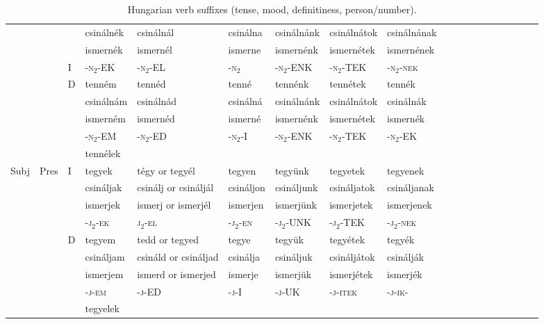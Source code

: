\documentclass[11pt,letterpaper]{article}
\begin{document}
\begin{table}[]
{\begin{tabular}{lll||llllllllllllllll}
      &     &        & csinálnék &	csinálnál &	csinálna &	csinálnánk 	&csinálnátok &	csinálnának \\
  &&&    ismernék &	ismernél &	ismerne &	ismernénk &	ismernétek &	ismernének \\
  & &   I    &-\textsc{n}$_2$-EK &	-\textsc{n}$_2$-EL &	-\textsc{n}$_2$ &	-\textsc{n}$_2$-ENK &	-\textsc{n}$_2$-TEK &	-\textsc{n}$_2$-\textsc{nek} \\\hline
   &&  D    &tenném &	tennéd &	tenné &	tennénk &	tennétek &	tennék \\
   &&       & csinálnám &	csinálnád &	csinálná &	csinálnánk &	csinálnátok &	csinálnák \\
 &&&  ismerném &	ismernéd &	ismerné &	ismernénk 	&ismernétek &	ismernék \\
&&      &-\textsc{n}$_2$-EM &	-\textsc{n}$_2$-ED &	-\textsc{n}$_2$-I &	-\textsc{n}$_2$-ENK &	-\textsc{n}$_2$-TEK &	-\textsc{n}$_2$-EK \\ \hline
       &&  &tennélek \\ \hline
Subj & Pres & I         &tegyek &	tégy or tegyél &	tegyen &	tegyünk &	tegyetek &	tegyenek \\
     &      &           & csináljak &	csinálj or
csináljál &	csináljon &	csináljunk& 	csináljatok &	csináljanak \\
&&&ismerjek &	ismerj or
ismerjél &	ismerjen &	ismerjünk &	ismerjetek &	ismerjenek \\
 &  &          &-\textsc{j}$_2$-\textsc{ek} &	\textsc{j}$_2$-\textsc{el} &	-\textsc{j}$_2$-\textsc{en} &	-\textsc{j}$_2$-UNK &	-\textsc{j}$_2$-TEK &	-\textsc{j}$_2$-\textsc{nek} \\ \hline
&&D         &tegyem &	tedd or tegyed &	tegye &	tegyük& 	tegyétek &	tegyék \\
&&          & csináljam &	csináld or
csináljad &	csinálja &	csináljuk &	csináljátok &	csinálják \\
&&&ismerjem &	ismerd or
ismerjed &	ismerje &	ismerjük &	ismerjétek & ismerjék
 \\
&&         &-\textsc{j}-\textsc{em} &	-\textsc{j}-\textsc{ED} &	-\textsc{j}-I &	-\textsc{j}-UK & 	-\textsc{j}-\textsc{itek} &	-\textsc{j}-\textsc{ik}- \\ \hline
  &&       &tegyelek \\
    \end{tabular}
    }
    \caption{Hungarian verb suffixes (tense, mood, definitiness, person/number).}
    \label{tab:hungarian-paradigms}
\end{table}
\end{document}
